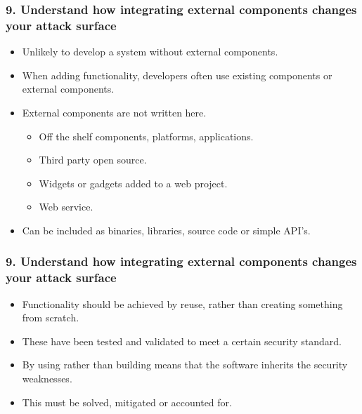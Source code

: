 \documentclass[12pt,norsk]{beamer}
\begin{document}
\begin{frame}

	\frametitle{9. Understand how integrating external components changes your attack surface}
	
	\begin{itemize}
		\item Unlikely to develop a system without external components.
		\item When adding functionality, developers often use existing components or external components.
		\item External components are not written here.
		\begin{itemize}
			\item Off the shelf components, platforms, applications.
			\item Third party open source.
			\item Widgets or gadgets added to a web project.
			\item Web service.
		\end{itemize}
		\item Can be included as binaries, libraries, source code or simple API's.
	\end{itemize}
\end{frame}

\begin{frame}

	\frametitle{9. Understand how integrating external components changes your attack surface}
	
	\begin{itemize}
		\item Functionality should be achieved by reuse, rather than creating something from scratch.
		\item These have been tested and validated to meet a certain security standard.
		\item By using rather than building means that the software inherits the security weaknesses.
		\item This must be solved, mitigated or accounted for.
	\end{itemize}
	

\end{frame}
\end{document}
